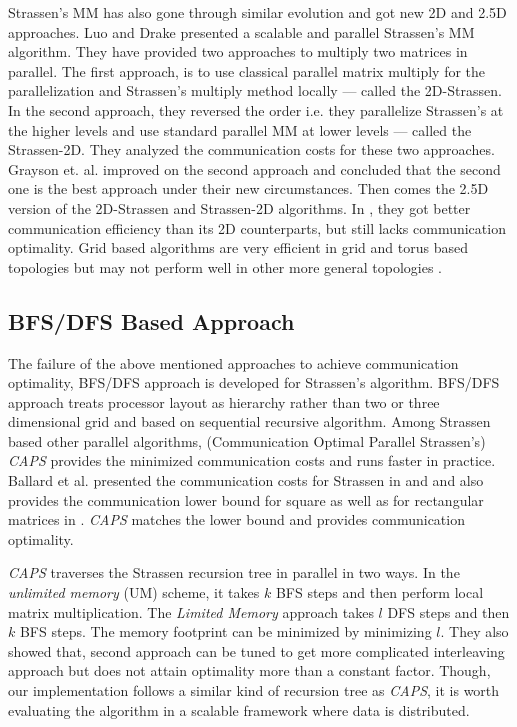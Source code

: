 Strassen's MM has also gone through similar evolution and got new 2D and 2.5D approaches. Luo and Drake \cite{luo1995scalable} presented a scalable and parallel Strassen's MM algorithm. They have provided two approaches to multiply two matrices in parallel. The first approach, is to use classical parallel matrix multiply for the parallelization and Strassen's multiply method locally --- called the 2D-Strassen. In the second approach, they reversed the order i.e. they parallelize Strassen's at the higher levels and use standard parallel MM at lower levels --- called the Strassen-2D. They analyzed the communication costs for these two approaches. Grayson et. al. \cite{grayson1996high} improved on the second approach and concluded that the second one is the best approach under their new circumstances. Then comes the 2.5D version of the 2D-Strassen and Strassen-2D algorithms. In \cite{solomonik2011improving}, they got better communication efficiency than its 2D counterparts, but still lacks communication optimality. Grid based algorithms are very efficient in grid and torus based topologies but may not perform well in other more general topologies \cite{demmel2013communication}.

\subsection{BFS/DFS Based Approach}
The failure of the above mentioned approaches to achieve communication optimality, BFS/DFS approach is developed \cite{ballard2012communication} for Strassen's algorithm. BFS/DFS approach treats processor layout as hierarchy rather than two or three dimensional grid and based on sequential recursive algorithm. Among Strassen based other parallel algorithms, (Communication Optimal Parallel Strassen's) \textit{CAPS} \cite{lipshitz2012communication} provides the minimized communication costs and runs faster in practice. Ballard et al. presented the communication costs for Strassen in \cite{ballard2012graph} and \cite{ballard2012communication} and also provides the communication lower bound for square as well as for rectangular matrices in \cite{demmel2013communication}. \textit{CAPS} matches the lower bound and provides communication optimality. 

\textit{CAPS} traverses the Strassen recursion tree in parallel in two ways. In the \textit{unlimited memory} (UM) scheme, it takes $k$ BFS steps and then perform local matrix multiplication. The \textit{Limited Memory} approach takes $l$ DFS steps and then $k$ BFS steps. The memory footprint can be minimized by minimizing $l$. They also showed that, second approach can be tuned to get more complicated interleaving approach but does not attain optimality more than a constant factor. Though, our implementation follows a similar kind of recursion tree as \textit{CAPS}, it is worth evaluating the algorithm in  a scalable framework where data is distributed.

